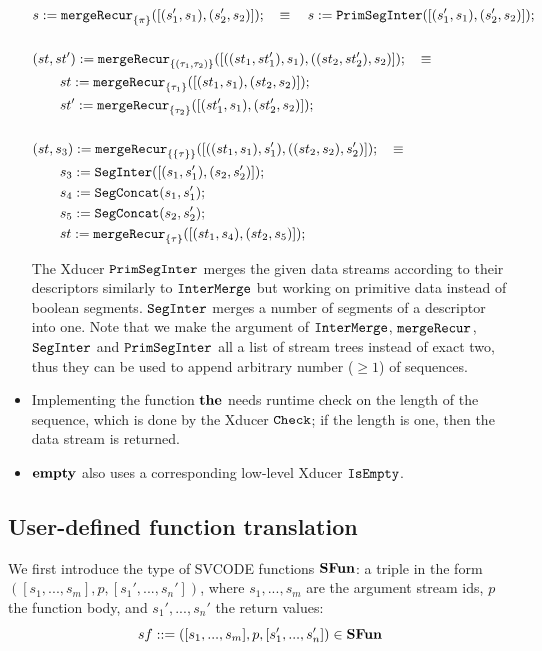 \begin{itemize}
\begin{align*}
& s := \mergeRecur{\{\pi\}}([(s_1',s_1),(s_2',s_2)]); \quad \equiv  \quad s := \primseginter([(s'_1,s_1), (s_2',s_2)]); \\
\\
&(st,st')  := \mergeRecur{\{(\tau_1,\tau_2)\}}([((st_1,st_1'),s_1),((st_2,st_2'),s_2)]); \quad \equiv \\ 
& \qquad st := \mergeRecur{\{\tau_1\}}([(st_1,s_1),(st_2,s_2)]); \\ 
& \qquad st' := \mergeRecur{\{\tau_2\}}([(st_1',s_1),(st_2',s_2)]);\\
\\
& (st,s_3)  := \mergeRecur{\{\{\tau\}\}}([((st_1,s_1),s_1'),((st_2,s_2),s_2')]); \quad \equiv \\
& \qquad s_3 := \seginter([(s_1,s_1'),(s_2,s_2')]); \\ 
& \qquad s_4 := \segconcat(s_1,s_1'); \\ 
& \qquad s_5 := \segconcat(s_2,s_2'); \\ 
&\qquad st := \mergeRecur{\{\tau\}}([(st_1,s_4),(st_2,s_5)]);
\end{align*}

The Xducer $\primseginter$ merges the given data streams according to their descriptors similarly to $\intermerge$ but working on primitive data instead of boolean segments.
$\seginter$ merges a number of segments of a descriptor into one.
Note that we make the argument of $\intermerge$, $\mergeRecur{}$, $\seginter$ and $\primseginter$  all a list of stream trees instead of exact two, thus they can be used to append arbitrary number ($\ge 1$) of sequences.

\item Implementing the function $\*{the}$ needs runtime check on the length of the sequence, which is done by the Xducer $\check$; if the length is one, then the data stream is returned.


\item $\*{empty}$ also uses a corresponding low-level Xducer $\isempty$.



\end{itemize}



\subsection{User-defined function translation}

We first introduce the type of SVCODE functions $\*{SFun}$: a triple in the form $([s_1,...,s_m], p, [s_1',...,s_n'])$, where $s_1,...,s_m$ are the argument stream ids, $p$ the function body, and $s_1',...,s_n'$ the return values:
$$ sf ::= ([s_1,...,s_m], p, [s_1',...,s_n']) \in \*{SFun}$$

